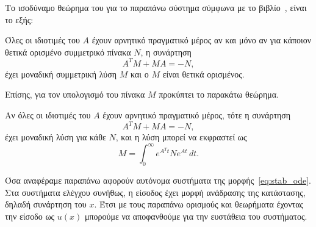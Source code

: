 Το ισοδύναμο θεώρημα του  για το παραπάνω σύστημα σύμφωνα
με το βιβλίο~\cite{chen1999linear}, είναι το εξής:
\begin{theorem} 
    Όλες οι ιδιοτιμές του \( A \) έχουν αρνητικό πραγματικό
    μέρος αν και μόνο αν για κάποιον θετικά ορισμένο
    συμμετρικό πίνακα \( N \), η συνάρτηση 
    \[
        A^{T}M + MA = -N,
    \]
    έχει μοναδική συμμετρική λύση \( M \) και ο \( M \)
    είναι θετικά ορισμένος.
\end{theorem}
Επίσης, για τον υπολογισμό του πίνακα \( M \) προκύπτει το παρακάτω θεώρημα.
\begin{theorem} 
    Αν όλες οι ιδιοτιμές του \( A \) έχουν αρνητικό πραγματικό μέρος,
    τότε η συνάρτηση 
    \[
        A^{T}M + MA = -N,
    \]
    έχει μοναδική λύση για κάθε \( N \), και η λύση μπορεί να εκφραστεί ως
    \[
        M = \int_0^{\infty}e^{A^{T}t}Ne^{At} \, dt.
    \]
\end{theorem}

Όσα αναφέραμε παραπάνω αφορούν αυτόνομα συστήματα της
μορφής~\eqref{eq:stab_ode}. Στα συστήματα ελέγχου συνήθως, η είσοδος έχει
μορφή ανάδρασης της κατάστασης, δηλαδή συνάρτηση του \( x \). Έτσι με τους παραπάνω
ορισμούς και θεωρήματα έχοντας την είσοδο ως \( u(x) \) μπορούμε να αποφανθούμε
για την ευστάθεια του συστήματος.

